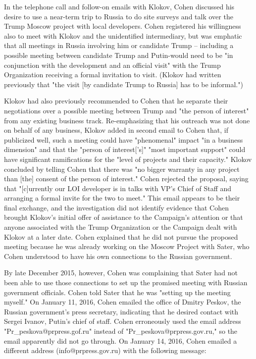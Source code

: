 In the telephone call and follow-on emails with Klokov, Cohen discussed his desire to use a near-term trip to Russia to do site surveys and talk over the Trump Moscow project with local developers.
Cohen registered his willingness also to meet with Klokov and the unidentified intermediary, but was emphatic that all meetings in Russia involving him or candidate Trump -- including a possible meeting between candidate Trump and Putin-would need to be "in conjunction with the development and an official visit" with the Trump Organization receiving a formal invitation to visit.
(Klokov had written previously that "the visit [by candidate Trump to Russia] has to be informal.")

Klokov had also previously recommended to Cohen that he separate their negotiations over a possible meeting between Trump and "the person of interest" from any existing business track.
Re-emphasizing that his outreach was not done on behalf of any business, Klokov added in second email to Cohen that, if publicized well, such a meeting could have "phenomenal" impact "in a business dimension" and that the "person of interest['s]" "most important support" could have significant ramifications for the "level of projects and their capacity."
Klokov concluded by telling Cohen that there was "no bigger warranty in any project than [the] consent of the person of interest."
Cohen rejected the proposal, saying that "[c]urrently our LOI developer is in talks with VP's Chief of Staff and arranging a formal invite for the two to meet."
This email appears to be their final exchange, and the investigation did not identify evidence that Cohen brought Klokov's initial offer of assistance to the Campaign's attention or that anyone associated with the Trump Organization or the Campaign dealt with Klokov at a later date.
Cohen explained that he did not pursue the proposed meeting because he was already working on the Moscow Project with Sater, who Cohen understood to have his own connections to the Russian government.

By late December 2015, however, Cohen was complaining that Sater had not been able to use those connections to set up the promised meeting with Russian government officials.
Cohen told Sater that he was "setting up the meeting myself."%
On January 11, 2016, Cohen emailed the office of Dmitry Peskov, the Russian government's press secretary, indicating that he desired contact with Sergei Ivanov, Putin's chief of staff.
Cohen erroneously used the email address "Pr_peskova@prpress.gof.ru" instead of "Pr_peskova@prpress.gov.ru," so the email apparently did not go through.%
On January 14, 2016, Cohen emailed a different address (info@prpress.gov.ru) with the following message:

